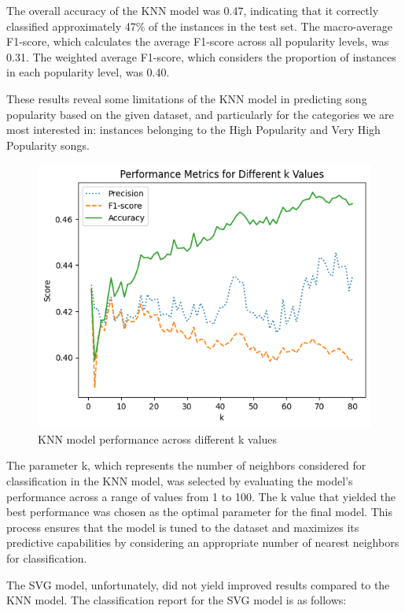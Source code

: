 \documentclass[11pt]{article} %
\begin{document}
The overall accuracy of the KNN model was 0.47, indicating that it correctly classified approximately 47\% of the instances in the test set. The macro-average F1-score, which calculates the average F1-score across all popularity levels, was 0.31. The weighted average F1-score, which considers the proportion of instances in each popularity level, was 0.40.

These results reveal some limitations of the KNN model in predicting song popularity based on the given dataset, and particularly for the categories we are most interested in: instances belonging to the High Popularity and Very High Popularity songs.

\begin{figure}[H]
	\centering
	\includegraphics[width=.8\linewidth]{performance_different_k_values.png}
	\caption{KNN model performance across different k values}\label{fig:knn_k_selection}
\end{figure}

The parameter k, which represents the number of neighbors considered for classification in the KNN model, was selected by evaluating the model's performance across a range of values from 1 to 100. The k value that yielded the best performance was chosen as the optimal parameter for the final model. This process ensures that the model is tuned to the dataset and maximizes its predictive capabilities by considering an appropriate number of nearest neighbors for classification.

The SVG model, unfortunately, did not yield improved results compared to the KNN model. The classification report for the SVG model is as follows:

\newblock
\end{document}
